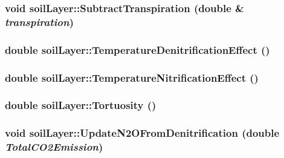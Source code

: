 \label{classsoil_layer_aa7189120b1afb35795a040acd399b179}
\hypertarget{classsoil_layer_afed3ac753d46a4ed2ea2b1f3e160752b}{
\subsubsection[{SubtractTranspiration}]{\setlength{\rightskip}{0pt plus 5cm}void soilLayer::SubtractTranspiration (double \& {\em transpiration})}}
\label{classsoil_layer_afed3ac753d46a4ed2ea2b1f3e160752b}
\hypertarget{classsoil_layer_afe9ca30f2da70f4708f2933f8971d7c1}{
\subsubsection[{TemperatureDenitrificationEffect}]{\setlength{\rightskip}{0pt plus 5cm}double soilLayer::TemperatureDenitrificationEffect ()}}
\label{classsoil_layer_afe9ca30f2da70f4708f2933f8971d7c1}
\hypertarget{classsoil_layer_a6a9f57294317984233f216b9ce747878}{
\subsubsection[{TemperatureNitrificationEffect}]{\setlength{\rightskip}{0pt plus 5cm}double soilLayer::TemperatureNitrificationEffect ()}}
\label{classsoil_layer_a6a9f57294317984233f216b9ce747878}
\hypertarget{classsoil_layer_adc0d1556be252d13f6facc7634757254}{
\subsubsection[{Tortuosity}]{\setlength{\rightskip}{0pt plus 5cm}double soilLayer::Tortuosity ()}}
\label{classsoil_layer_adc0d1556be252d13f6facc7634757254}
\hypertarget{classsoil_layer_ae923fdabe8dc5e40195e3cf39b9ef569}{
\subsubsection[{UpdateN2OFromDenitrification}]{\setlength{\rightskip}{0pt plus 5cm}void soilLayer::UpdateN2OFromDenitrification (double {\em TotalCO2Emission})}}

